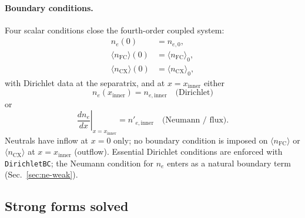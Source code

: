 \paragraph{Boundary conditions.}
Four scalar conditions close the fourth-order coupled system:
\begin{subequations}
\label{eq:bcs}
\begin{align}
  n_e(0) &= n_{e,0}, \label{eq:bc-ne0}\\
  \langle n_{\mathrm{FC}}\rangle(0) &= \langle n_{\mathrm{FC}}\rangle_{0}, \label{eq:bc-nfc0}\\
  \langle n_{\mathrm{CX}}\rangle(0) &= \langle n_{\mathrm{CX}}\rangle_{0}, \label{eq:bc-ncx0}
\end{align}
\end{subequations}
with Dirichlet data at the separatrix, and at $x=x_{\mathrm{inner}}$ either
\begin{equation}
  n_e(x_{\mathrm{inner}}) = n_{e,\mathrm{inner}}
  \quad\text{(Dirichlet)}
  \label{eq:bc-ne-dirichlet}
\end{equation}
or
\begin{equation}
  \left.\frac{dn_e}{dx}\right|_{x=x_{\mathrm{inner}}} = n'_{e,\mathrm{inner}}
  \quad\text{(Neumann / flux)}.
  \label{eq:bc-ne-neumann}
\end{equation}
Neutrals have inflow at $x=0$ only; no boundary condition is imposed on
$\langle n_{\mathrm{FC}}\rangle$ or $\langle n_{\mathrm{CX}}\rangle$ at
$x=x_{\mathrm{inner}}$ (outflow).
Essential Dirichlet conditions are enforced with \texttt{DirichletBC}; the
Neumann condition for $n_e$ enters as a natural boundary term
(Sec.~\ref{sec:ne-weak}).

\subsection{Strong forms solved}
\label{sec:strong}

